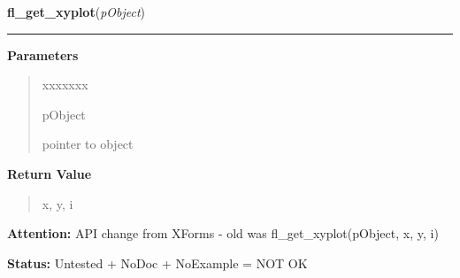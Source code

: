 \hspace{.8\funcindent}\begin{boxedminipage}{\funcwidth}

    \raggedright \textbf{fl\_get\_xyplot}(\textit{pObject})

    \vspace{-1.5ex}

    \rule{\textwidth}{0.5\fboxrule}
\setlength{\parskip}{2ex}
\setlength{\parskip}{1ex}
      \textbf{Parameters}
      \vspace{-1ex}

      \begin{quote}
        \begin{Ventry}{xxxxxxx}

          \item[pObject]

          pointer to object

        \end{Ventry}

      \end{quote}

      \textbf{Return Value}
    \vspace{-1ex}

      \begin{quote}
      x, y, i

      \end{quote}

\textbf{Attention:} API change from XForms - old was fl\_get\_xyplot(pObject, x, y, i)



\textbf{Status:} Untested + NoDoc + NoExample = NOT OK



    \end{boxedminipage}

    \label{xformslib:library:fl_get_xyplot_data}

    \vspace{0.5ex}

